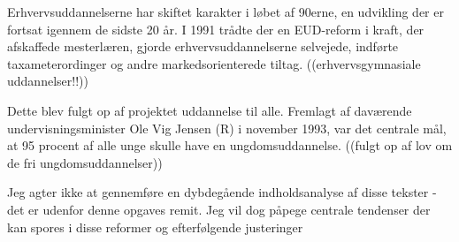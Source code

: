 Erhvervsuddannelserne har skiftet karakter i løbet af 90erne, en udvikling der er fortsat igennem de sidste 20 år.
I 1991 trådte der en EUD-reform i kraft, der afskaffede mesterlæren, gjorde erhvervsuddannelserne selvejede, indførte taxameterordinger og andre markedsorienterede tiltag.
((erhvervsgymnasiale uddannelser!!))


Dette blev fulgt op af projektet uddannelse til alle.
Fremlagt af daværende undervisningsminister Ole Vig Jensen (R) i november 1993, var det centrale mål, at 95 procent af alle unge skulle have en ungdomsuddannelse.
((fulgt op af lov om de fri ungdomsuddannelser))

Jeg agter ikke at gennemføre en dybdegående indholdsanalyse af disse tekster - det er udenfor denne opgaves remit.
Jeg vil dog påpege centrale tendenser der kan spores i disse reformer og efterfølgende justeringer
